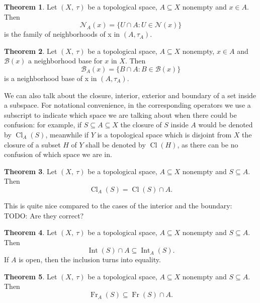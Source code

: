 \documentclass[a4paper]{book}
\theoremstyle{definition}
\newtheorem{theorem}{Theorem}[section]
\theoremstyle{ejemplo}
\theoremstyle{demostracion}
\DeclareMathOperator{\interior}{Int}
\DeclareMathOperator{\closure}{Cl}
\DeclareMathOperator{\boundary}{Fr}
\begin{document}
\begin{theorem}
	Let $(X,\ \tau)$ be a topological space, $A \subseteq X$ nonempty and $x \in A$. Then
	\begin{equation*}
		\mathcal{N}_A(x) = \{ U \cap A : U \in \mathcal{N}(x)\}
	\end{equation*}
	is the family of neighborhoods of x in $(A, \tau_A)$.
\end{theorem}

\begin{theorem}
	Let $(X,\ \tau)$ be a topological space, $A \subseteq X$ nonempty, $x \in A$ and $\mathcal{B}(x)$ a neighborhood base for $x$ in $X$. Then
	\begin{equation*}
		\mathcal{B}_A(x) = \{ B \cap A : B \in \mathcal{B}(x)\}
	\end{equation*}
	is a neighborhood base of x in $(A, \tau_A)$.
\end{theorem}

We can also talk about the closure, interior, exterior and boundary of a set inside a subspace. For notational convenience, in the corresponding operators we use a subscript to indicate which space we are talking about when there could be confusion: for example, if $S \subseteq A \subseteq X$ the closure of $S$ inside $A$ would be denoted by $\closure_A(S)$, meanwhile if $Y$ is a topological space which is disjoint from $X$ the closure of a subset $H$ of $Y$ shall be denoted by $\closure(H)$, as there can be no confusion of which space we are in.

\begin{theorem}
	Let $(X,\ \tau)$ be a topological space, $A \subseteq X$ nonempty and $S \subseteq A$. Then
	\begin{equation*}
		\closure_A(S) = \closure(S) \cap A.
	\end{equation*}
\end{theorem}

This is quite nice compared to the cases of the interior and the boundary: TODO: Are they correct?
\begin{theorem}\label{interior_in_subspace}
	Let $(X,\ \tau)$ be a topological space, $A \subseteq X$ nonempty and $S \subseteq A$. Then
	\begin{equation*}
		 \interior(S) \cap A \subseteq \interior_A(S).
	\end{equation*}
	If $A$ is open, then the inclusion turns into equality.
\end{theorem}

\begin{theorem}
	Let $(X,\ \tau)$ be a topological space, $A \subseteq X$ nonempty and $S \subseteq A$. Then
	\begin{equation*}
		 \boundary_A(S) \subseteq \boundary(S) \cap A.
	\end{equation*}
\end{theorem}
\end{document}
